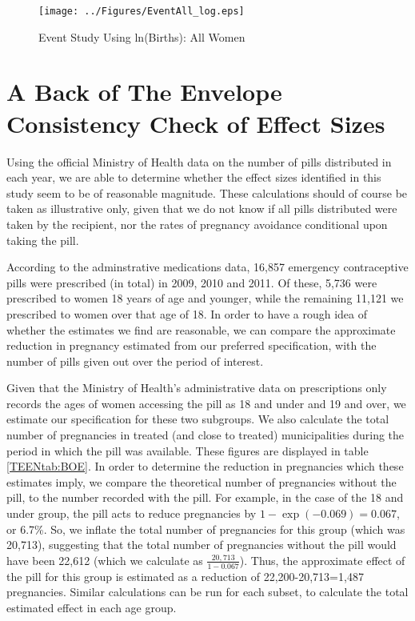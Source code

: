 \documentclass[11pt,subeqn]{article}
\begin{document}
\begin{spacing}{1.4}
\begin{figure}[htpb!]
  \begin{center}
    \caption{Event Study Using ln(Births): All Women}
    \vspace{-5mm}
    \label{TEENfig:Event2034log}
    \texttt{[image: ../Figures/EventAll\_log.eps]}
  \end{center}
  \end{figure}

\section{A Back of The Envelope Consistency Check of Effect Sizes}
\label{TEENscn:BOE}
Using the official Ministry of Health data on the number of pills distributed
in each year, we are able to determine whether the effect sizes identified in
this study seem to be of reasonable magnitude.  These calculations should of
course be taken as illustrative only, given that we do not know if all pills
distributed were taken by the recipient, nor the rates of pregnancy avoidance
conditional upon taking the pill.

According to the adminstrative medications data, 16,857 emergency 
contraceptive pills were prescribed (in total) in 2009, 2010 and 2011. Of 
these, 5,736 were prescribed to women 18 years of age and younger, while the
remaining 11,121 we prescribed to women over that age of 18.  In order to have
a rough idea of whether the estimates we find are reasonable, we can compare
the approximate reduction in pregnancy estimated from our preferred 
specification, with the number of pills given out over the period of interest.

Given that the Ministry of Health's administrative data on prescriptions only
records the ages of women accessing the pill as 18 and under and 19 and over,
we estimate our specification for these two subgroups.  We also
calculate the total number of pregnancies in treated (and close to treated)
municipalities during the period in which the pill was available.  These 
figures are displayed in table \ref{TEENtab:BOE}.  In order to determine the
reduction in pregnancies which these estimates imply, we compare the 
theoretical number of pregnancies without the pill, to the number recorded 
with the pill.  For example, in the case of the 18 and under group, the pill acts 
to reduce pregnancies by $1-\exp(-0.069)=0.067$, or 6.7\%.  So, we inflate the 
total number of pregnancies for this group (which was 20,713), suggesting that 
the total number of pregnancies without the pill would have been 22,612 (which
we calculate as $\frac{20,713}{1-0.067}$).  Thus, the approximate effect of the 
pill for this group is estimated as a reduction of 22,200-20,713=1,487
pregnancies.  Similar calculations can be run for each subset, to calculate the
total estimated effect in each age group.


\end{spacing}
\end{document}
